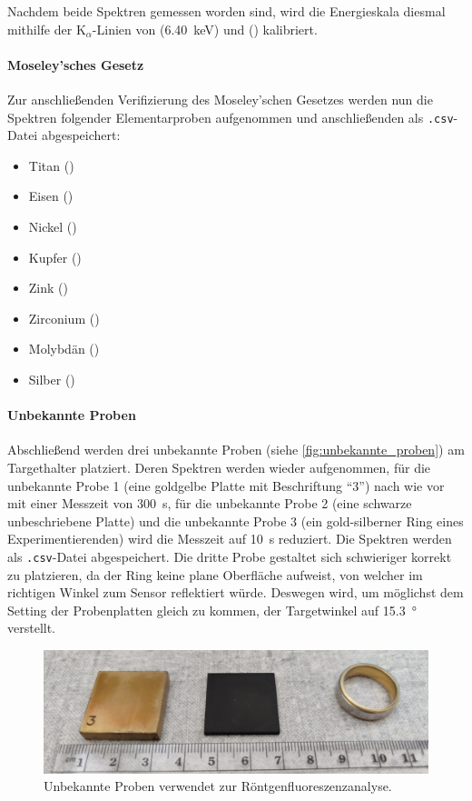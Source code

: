 \documentclass[ngerman]{scrartcl}
\begin{document}
Nachdem beide Spektren gemessen worden sind, wird die Energieskala diesmal mithilfe der K$_\alpha$-Linien von  (\SI{6,40}{keV}) und  () kalibriert.

\paragraph{Moseley'sches Gesetz}
Zur anschließenden Verifizierung des Moseley'schen Gesetzes werden nun die Spektren folgender Elementarproben aufgenommen und anschließenden als \texttt{.csv}-Datei abgespeichert:
\begin{itemize}
    \item Titan ()
    \item Eisen ()
    \item Nickel ()
    \item Kupfer ()
    \item Zink ()
    \item Zirconium ()
    \item Molybdän ()
    \item Silber ()
\end{itemize}

\paragraph{Unbekannte Proben}
Abschließend werden drei unbekannte Proben (siehe \autoref{fig:unbekannte_proben}) am Targethalter platziert. Deren Spektren werden wieder aufgenommen, für die unbekannte Probe 1 (eine goldgelbe Platte mit Beschriftung \enquote{3}) nach wie vor mit einer Messzeit von \SI{300}{s}, für die unbekannte Probe 2 (eine schwarze unbeschriebene Platte) und die unbekannte Probe 3 (ein gold-silberner Ring eines Experimentierenden) wird die Messzeit auf \SI{10}{s} reduziert. Die Spektren werden als \texttt{.csv}-Datei abgespeichert. Die dritte Probe gestaltet sich schwieriger korrekt zu platzieren, da der Ring keine plane Oberfläche aufweist, von welcher im richtigen Winkel zum Sensor reflektiert würde. Deswegen wird, um möglichst dem Setting der Probenplatten gleich zu kommen, der Targetwinkel auf \SI{15.3}{\degree} verstellt.
%
\begin{figure}[H]
    \centering
    \begin{samepage}
        \includegraphics[width=\linewidth]{fig/unbekannt.png}
        \caption[Unbekannte Proben]{Unbekannte Proben verwendet zur Röntgenfluoreszenzanalyse.}
        \label{fig:unbekannte_proben}
    \end{samepage}
\end{figure}
\end{document}
